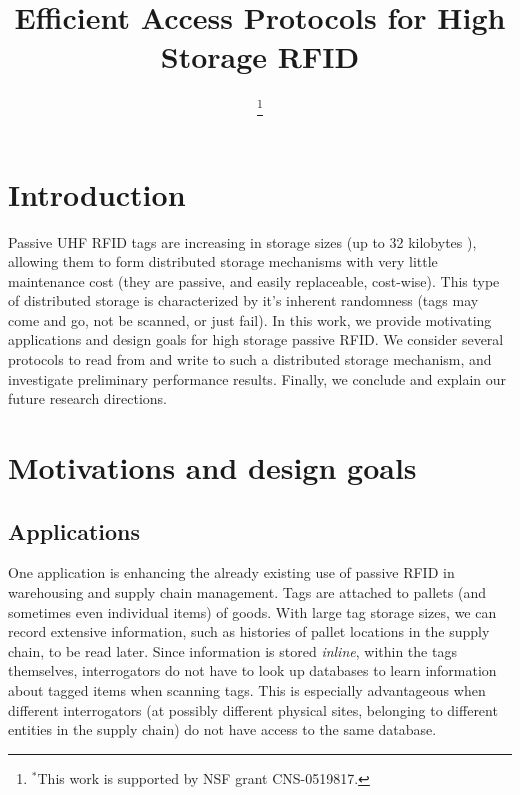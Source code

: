 \documentclass[conference]{IEEEtran}
\begin{document}
\title{Efficient Access Protocols for High Storage RFID}

\author{
\thanks{$^*$This work is supported by NSF grant  CNS-0519817.}
}

\maketitle

\section{Introduction}
Passive UHF RFID tags are increasing in storage sizes (up to 32 kilobytes \cite{web:tego}), allowing them to form distributed storage mechanisms with very little maintenance cost (they are passive, and easily replaceable, cost-wise).  This type of distributed storage is characterized by it's inherent randomness (tags may come and go, not be scanned, or just fail).  In this work, we provide motivating applications and design goals for high storage passive RFID.  We consider several protocols to read from and write to such a distributed storage mechanism, and investigate preliminary performance results.  Finally, we conclude and explain our future research directions.

\section{Motivations and design goals}
\subsection{Applications}
One application is enhancing the already existing use of passive RFID in warehousing and supply chain management.  Tags are attached to pallets (and sometimes even individual items) of goods.  With large tag storage sizes, we can record extensive information, such as histories of pallet locations in the supply chain, to be read later.  Since information is stored \emph{inline}, within the tags themselves, interrogators do not have to look up databases to learn information about tagged items when scanning tags.  This is especially advantageous when different interrogators (at possibly different physical sites, belonging to different entities in the supply chain) do not have access to the same database.
\end{document}
